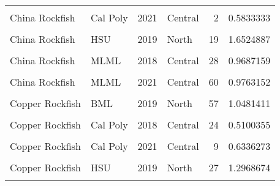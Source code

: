 \documentclass[
]{article}
\begin{document}
\begin{longtable}[t]{llrlrr}
\addlinespace
\cellcolor{gray!6}{China Rockfish} & \cellcolor{gray!6}{Cal Poly} & \cellcolor{gray!6}{2019} & \cellcolor{gray!6}{Central} & \cellcolor{gray!6}{3} & \cellcolor{gray!6}{0.5337796}\\
China Rockfish & Cal Poly & 2021 & Central & 2 & 0.5833333\\
\cellcolor{gray!6}{China Rockfish} & \cellcolor{gray!6}{HSU} & \cellcolor{gray!6}{2018} & \cellcolor{gray!6}{North} & \cellcolor{gray!6}{24} & \cellcolor{gray!6}{1.2553403}\\
China Rockfish & HSU & 2019 & North & 19 & 1.6524887\\
\cellcolor{gray!6}{China Rockfish} & \cellcolor{gray!6}{HSU} & \cellcolor{gray!6}{2021} & \cellcolor{gray!6}{North} & \cellcolor{gray!6}{27} & \cellcolor{gray!6}{1.5590772}\\
\addlinespace
China Rockfish & MLML & 2018 & Central & 28 & 0.9687159\\
\cellcolor{gray!6}{China Rockfish} & \cellcolor{gray!6}{MLML} & \cellcolor{gray!6}{2019} & \cellcolor{gray!6}{Central} & \cellcolor{gray!6}{29} & \cellcolor{gray!6}{0.5334113}\\
China Rockfish & MLML & 2021 & Central & 60 & 0.9763152\\
\cellcolor{gray!6}{Copper Rockfish} & \cellcolor{gray!6}{BML} & \cellcolor{gray!6}{2018} & \cellcolor{gray!6}{North} & \cellcolor{gray!6}{15} & \cellcolor{gray!6}{0.5830415}\\
Copper Rockfish & BML & 2019 & North & 57 & 1.0481411\\
\addlinespace
\cellcolor{gray!6}{Copper Rockfish} & \cellcolor{gray!6}{BML} & \cellcolor{gray!6}{2021} & \cellcolor{gray!6}{North} & \cellcolor{gray!6}{33} & \cellcolor{gray!6}{1.0886311}\\
Copper Rockfish & Cal Poly & 2018 & Central & 24 & 0.5100355\\
\cellcolor{gray!6}{Copper Rockfish} & \cellcolor{gray!6}{Cal Poly} & \cellcolor{gray!6}{2019} & \cellcolor{gray!6}{Central} & \cellcolor{gray!6}{21} & \cellcolor{gray!6}{0.5926657}\\
Copper Rockfish & Cal Poly & 2021 & Central & 9 & 0.6336273\\
\cellcolor{gray!6}{Copper Rockfish} & \cellcolor{gray!6}{HSU} & \cellcolor{gray!6}{2018} & \cellcolor{gray!6}{North} & \cellcolor{gray!6}{43} & \cellcolor{gray!6}{1.6672133}\\
\addlinespace
Copper Rockfish & HSU & 2019 & North & 27 & 1.2968674\\
\cellcolor{gray!6}{Copper Rockfish} & \cellcolor{gray!6}{HSU} & \cellcolor{gray!6}{2021} & \cellcolor{gray!6}{North} & \cellcolor{gray!6}{27} & \cellcolor{gray!6}{1.3684186}\\

\end{longtable}
\end{document}
